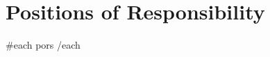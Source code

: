 \section{Positions of Responsibility}
\vspace{0pt}
\resumeSubHeadingListStart

{{#each pors}}
{{/each}}

\resumeSubHeadingListEnd
\vspace{-4mm}
